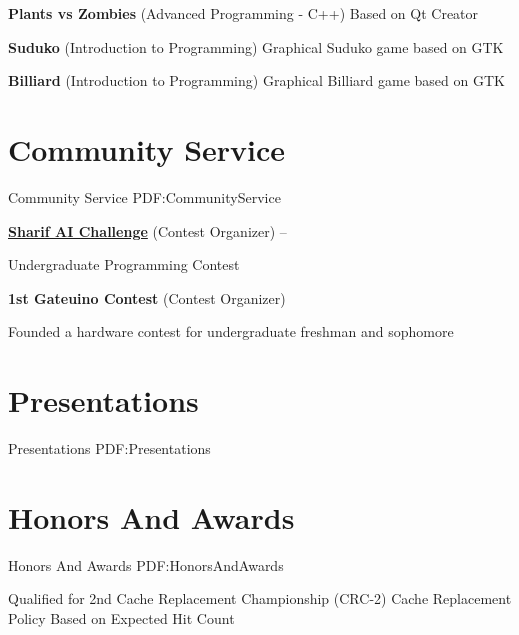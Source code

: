 \documentclass[a4paper,9pt,oneside]{article}
\begin{document}
\begin{body}
\BulletItem
\textbf{Plants vs Zombies} (Advanced Programming - C++)
\hfill
{}
\SubBulletItem
Based on Qt Creator

\BulletItem
\textbf{Suduko} (Introduction to Programming)
\hfill
{}
\SubBulletItem
Graphical Suduko game based on GTK

\BulletItem
\textbf{Billiard} (Introduction to Programming)
\hfill
{}
\SubBulletItem
Graphical Billiard game based on GTK

\section
{Community Service}
{Community Service}
{PDF:CommunityService}

\BulletItem
\href{https://github.com/SharifAIChallenge}{
\textbf{Sharif AI Challenge}} (Contest Organizer)
\hfill
{} --

\SubBulletItem
Undergraduate Programming Contest

\BulletItem
\textbf{1st Gateuino Contest} (Contest Organizer)
\hfill
{}

\SubBulletItem
Founded a hardware contest for undergraduate freshman and sophomore

\section
{Presentations}
{Presentations}
{PDF:Presentations}


\section
{Honors\newline
And\newline
Awards}
{Honors\newline
And\newline
Awards}
{PDF:HonorsAndAwards}

\BulletItem
Qualified for 2nd Cache Replacement Championship (CRC-2)
\SubBulletItem
Cache Replacement Policy Based on Expected Hit Count
\hfill
{}



\end{body}
\end{document}
